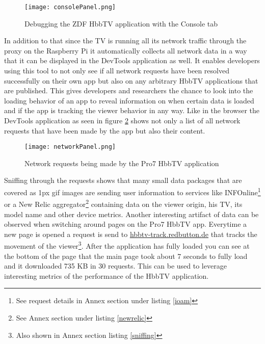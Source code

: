 \begin{figure}[htb]
  \centering
  \hspace*{-0.7cm}
  \texttt{[image: consolePanel.png]}\\
  \caption{Debugging the ZDF HbbTV application with the Console tab}\label{fig:consolePanel}
\end{figure}

In addition to that since the TV is running all its network traffic through the proxy on the Raspberry Pi
it automatically collects all network data in a way that it can be displayed in the DevTools application as well.
It enables developers using this tool to not only see if all network requests have been resolved successfully
on their own app but also on any arbitrary HbbTV applications that are published. This gives developers and
researchers the chance to look into the loading behavior of an app to reveal information on when certain data
is loaded and if the app is tracking the viewer behavior in any way. Like in the browser the DevTools application
as seen in figure \ref{fig:networkPanel} shows not only a list of all network requests that have been made by the
app but also their content.

\begin{figure}[htb]
  \centering
  \hspace*{-0.7cm}
  \texttt{[image: networkPanel.png]}\\
  \caption{Network requests being made by the Pro7 HbbTV application}\label{fig:networkPanel}
\end{figure}

Sniffing through the requests shows that many small data packages that are covered as 1px gif images are
sending user information to services like INFOnline\footnote{See request details in Annex section under
listing \ref{ioam}} or a New Relic aggregator\footnote{See Annex section under listing \ref{newrelic}}
containing data on the viewer origin, his TV, its model name and other device metrics. Another
interesting artifact of data can be observed when switching around pages on the Pro7 HbbTV app. Everytime
a new page is opened a request is send to \url{hbbtv-track.redbutton.de} that tracks the movement of the
viewer\footnote{Also shown in Annex section listing \ref{sniffing}}. After the application has fully loaded
you can see at the bottom of the page that the main page took about 7 seconds to fully load and it
downloaded 735 KB in 30 requests. This can be used to leverage interesting metrics of the performance of
the HbbTV application.

